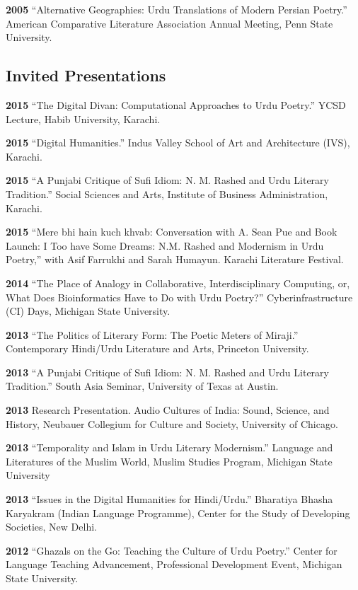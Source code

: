 \documentclass[letterpaper,12pt]{article}
\begin{document}
\textbf{2005}
“Alternative Geographies: Urdu Translations of Modern Persian Poetry.”
American Comparative Literature Association Annual Meeting, Penn State University.


\subsection{Invited Presentations%
  \label{invited-presentations}%
}

\textbf{2015}
“The Digital Divan: Computational Approaches to Urdu Poetry.”
YCSD Lecture, Habib University, Karachi.

\textbf{2015}
“Digital Humanities.”
Indus Valley School of Art and Architecture (IVS), Karachi.

\textbf{2015}
“A Punjabi Critique of Sufi Idiom: N. M. Rashed and Urdu Literary Tradition.”
Social Sciences and Arts, Institute of Business Administration, Karachi.

\textbf{2015}
“Mere bhi hain kuch khvab: Conversation with A. Sean Pue and Book Launch: I Too have Some Dreams: N.M. Rashed and Modernism in Urdu Poetry,” with Asif Farrukhi and Sarah Humayun.
Karachi Literature Festival.

\textbf{2014}
“The Place of Analogy in Collaborative, Interdisciplinary Computing,
or,
What Does Bioinformatics Have to Do with Urdu Poetry?”
Cyberinfrastructure (CI) Days, Michigan State University.

\textbf{2013}
“The Politics of Literary Form: The Poetic Meters of Miraji.”
Contemporary Hindi/Urdu Literature and Arts, Princeton University.

\textbf{2013}
“A Punjabi Critique of Sufi Idiom: N. M. Rashed and Urdu Literary Tradition.”
South Asia Seminar, University of Texas at Austin.

\textbf{2013}
Research Presentation.
Audio Cultures of India: Sound, Science, and History,
Neubauer Collegium for Culture and Society, University of Chicago.

\textbf{2013}
“Temporality and Islam in Urdu Literary Modernism.”
Language and Literatures of the Muslim World,
Muslim Studies Program,
Michigan State University

\textbf{2013}
“Issues in the Digital Humanities for Hindi/Urdu.”
Bharatiya Bhasha Karyakram (Indian Language Programme),
Center for the Study of Developing Societies, New Delhi.

\textbf{2012}
“Ghazals on the Go: Teaching the Culture of Urdu Poetry.”
Center for Language Teaching Advancement,
Professional Development Event,
Michigan State University.
\end{document}
